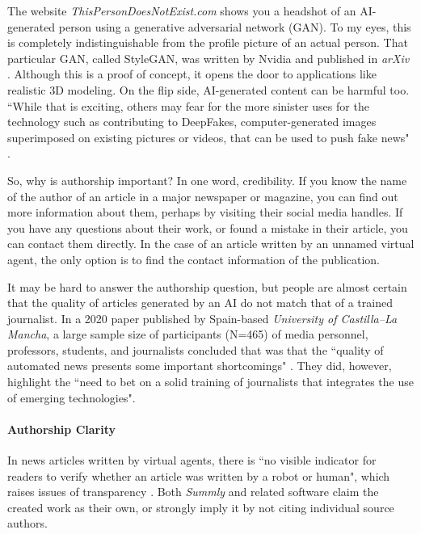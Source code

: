 \documentclass{article}
\begin{document}
The website \emph{ThisPersonDoesNotExist.com} shows you a headshot of an AI-generated person using a generative adversarial network (GAN). To my eyes, this is completely indistinguishable from the profile picture of an actual person. That particular GAN, called StyleGAN, was written by Nvidia and published in \emph{arXiv} \cite{karras_style-based_2019}. Although this is a proof of concept, it opens the door to applications like realistic 3D modeling. On the flip side, AI-generated content can be harmful too. ``While that is exciting, others may fear for the more sinister uses for the technology such as contributing to DeepFakes, computer-generated images superimposed on existing pictures or videos, that can be used to push fake news" \cite{noauthor_this_2019-1}.

So, why is authorship important? In one word, credibility. If you know the name of the author of an article in a major newspaper or magazine, you can find out more information about them, perhaps by visiting their social media handles. If you have any questions about their work, or found a mistake in their article, you can contact them directly. In the case of an article written by an unnamed virtual agent, the only option is to find the contact information of the publication.

It may be hard to answer the authorship question, but people are almost certain that the quality of articles generated by an AI do not match that of a trained journalist. In a 2020 paper published by Spain-based \emph{University of Castilla–La Mancha}, a large sample size of participants (N=465) of media personnel, professors, students, and journalists concluded that was that the ``quality of automated news presents some important shortcomings" \cite{calvo-rubio_percepcion_2019}. They did, however, highlight the ``need to bet on a solid training of journalists that integrates the use of emerging technologies".

\paragraph{Authorship Clarity}

In news articles written by virtual agents, there is ``no visible indicator for readers to verify whether an article was written by a robot or human", which raises issues of transparency \cite{dorr_ethical_2017}. Both \emph{Summly} and related software claim the created work as their own, or strongly imply it by not citing individual source authors.
\end{document}
